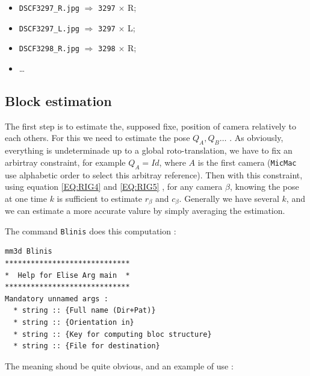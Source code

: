 \begin{itemize}
    \item {\tt DSCF3297\_R.jpg}  $\Rightarrow$   {\tt 3297}  $\times$    {R};
    \item {\tt DSCF3297\_L.jpg}  $\Rightarrow$   {\tt 3297}  $\times$    {L};
    \item {\tt DSCF3298\_R.jpg}  $\Rightarrow$   {\tt 3298}  $\times$    {R};
    \item \dots
\end{itemize}



\subsection{Block estimation}

The first step is to estimate the, supposed fixe, position of camera relatively to each others. For this
we need to estimate the pose  $Q_A,Q_B \dots$ . As obviously,  everything is undeterminade up to a global
roto-translation, we have to fix an arbirtray constraint, for example $Q_A=Id$, where $A$ is the first
camera ({\tt MicMac} use alphabetic order to select this arbitray reference).  Then with this constraint,
using equation \ref{EQ:RIG4}  and \ref{EQ:RIG5} , for any camera $\beta$, knowing the pose at one time 
$k$ is sufficient to estimate  $r_{\beta}$ and $c_{\beta}$. Generally we have several $k$, and we can
estimate a more accurate valure by simply averaging the estimation.

The command {\tt Blinis} does this computation :

\begin{verbatim}
mm3d Blinis 
*****************************
*  Help for Elise Arg main  *
*****************************
Mandatory unnamed args : 
  * string :: {Full name (Dir+Pat)}
  * string :: {Orientation in}
  * string :: {Key for computing bloc structure}
  * string :: {File for destination}
\end{verbatim}


The meaning shoud be quite obvious, and an example of use :

